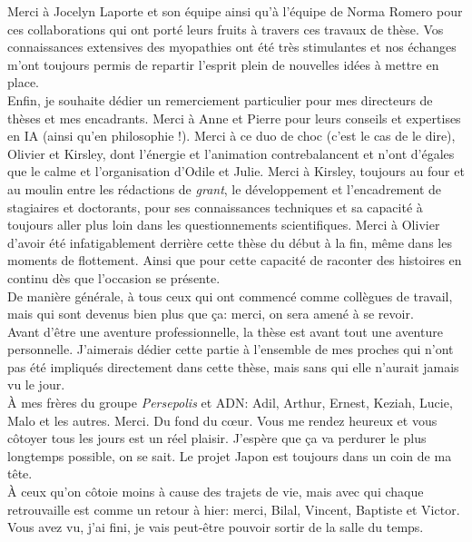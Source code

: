 Merci à Jocelyn Laporte et son équipe ainsi qu'à l'équipe de Norma Romero pour ces collaborations qui ont porté leurs fruits à travers ces travaux de thèse. Vos connaissances extensives des myopathies ont été très stimulantes et nos échanges m'ont toujours permis de repartir l'esprit plein de nouvelles idées à mettre en place. \\

Enfin, je souhaite dédier un remerciement particulier pour mes directeurs de thèses et mes encadrants. Merci à Anne et Pierre pour leurs conseils et expertises en IA (ainsi qu'en philosophie !). Merci à ce duo de choc (c'est le cas de le dire), Olivier et Kirsley, dont l'énergie et l'animation contrebalancent et n'ont d'égales que le calme et l'organisation d'Odile et Julie. Merci à Kirsley, toujours au four et au moulin entre les rédactions de \textit{grant}, le développement et l'encadrement de stagiaires et doctorants, pour ses connaissances techniques et sa capacité à toujours aller plus loin dans les questionnements scientifiques. Merci à Olivier d'avoir été infatigablement derrière cette thèse du début à la fin, même dans les moments de flottement. Ainsi que pour cette capacité de raconter des histoires en continu dès que l'occasion se présente. \\

De manière générale, à tous ceux qui ont commencé comme collègues de travail, mais qui sont devenus bien plus que ça: merci, on sera amené à se revoir. \\

Avant d'être une aventure professionnelle, la thèse est avant tout une aventure personnelle. J'aimerais dédier cette partie à l'ensemble de mes proches qui n'ont pas été impliqués directement dans cette thèse, mais sans qui elle n'aurait jamais vu le jour. \\

À mes frères du groupe \textit{Persepolis} et ADN: Adil, Arthur, Ernest, Keziah, Lucie, Malo et les autres. Merci. Du fond du cœur. Vous me rendez heureux et vous côtoyer tous les jours est un réel plaisir. J'espère que ça va perdurer le plus longtemps possible, on se sait. Le projet Japon est toujours dans un coin de ma tête. \\

À ceux qu'on côtoie moins à cause des trajets de vie, mais avec qui chaque retrouvaille est comme un retour à hier: merci, Bilal, Vincent, Baptiste et Victor. Vous avez vu, j'ai fini, je vais peut-être pouvoir sortir de la salle du temps. \\

